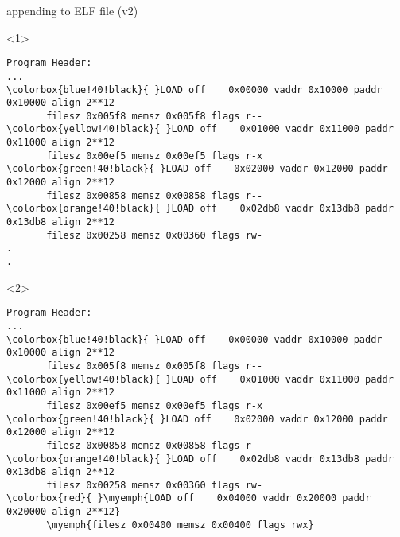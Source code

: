 \begin{frame}[fragile,label=appendElfB]{appending to ELF file (v2)}
\begin{onlyenv}<1>
\begin{Verbatim}[fontsize=\fontsize{9}{10}\selectfont,commandchars=\\\{\}]
Program Header:
...
\colorbox{blue!40!black}{ }LOAD off    0x00000 vaddr 0x10000 paddr 0x10000 align 2**12
       filesz 0x005f8 memsz 0x005f8 flags r--
\colorbox{yellow!40!black}{ }LOAD off    0x01000 vaddr 0x11000 paddr 0x11000 align 2**12
       filesz 0x00ef5 memsz 0x00ef5 flags r-x
\colorbox{green!40!black}{ }LOAD off    0x02000 vaddr 0x12000 paddr 0x12000 align 2**12
       filesz 0x00858 memsz 0x00858 flags r--
\colorbox{orange!40!black}{ }LOAD off    0x02db8 vaddr 0x13db8 paddr 0x13db8 align 2**12
       filesz 0x00258 memsz 0x00360 flags rw-
.
.
\end{Verbatim}
\end{onlyenv}
\begin{onlyenv}<2>
\begin{Verbatim}[fontsize=\fontsize{9}{10}\selectfont,commandchars=\\\{\}]
Program Header:
...
\colorbox{blue!40!black}{ }LOAD off    0x00000 vaddr 0x10000 paddr 0x10000 align 2**12
       filesz 0x005f8 memsz 0x005f8 flags r--
\colorbox{yellow!40!black}{ }LOAD off    0x01000 vaddr 0x11000 paddr 0x11000 align 2**12
       filesz 0x00ef5 memsz 0x00ef5 flags r-x
\colorbox{green!40!black}{ }LOAD off    0x02000 vaddr 0x12000 paddr 0x12000 align 2**12
       filesz 0x00858 memsz 0x00858 flags r--
\colorbox{orange!40!black}{ }LOAD off    0x02db8 vaddr 0x13db8 paddr 0x13db8 align 2**12
       filesz 0x00258 memsz 0x00360 flags rw-
\colorbox{red}{ }\myemph{LOAD off    0x04000 vaddr 0x20000 paddr 0x20000 align 2**12}
       \myemph{filesz 0x00400 memsz 0x00400 flags rwx}
\end{Verbatim}
\end{onlyenv}

\end{frame}
